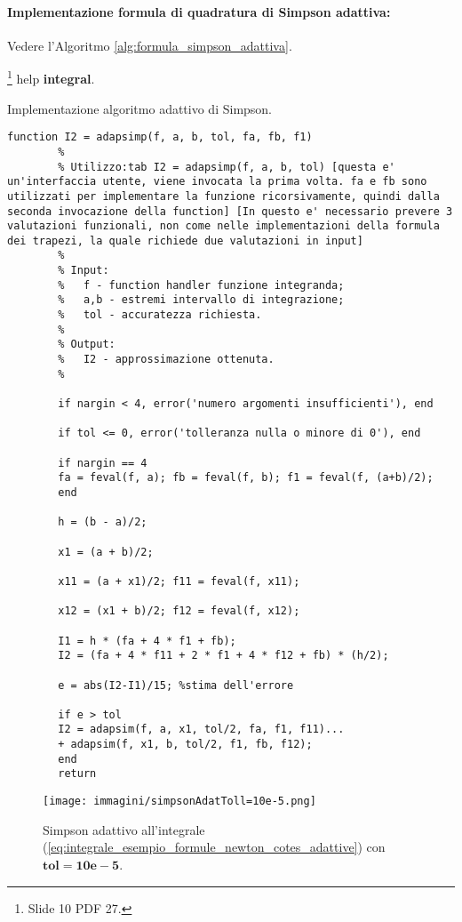 \paragraph{Implementazione formula di quadratura di Simpson adattiva:} Vedere l'Algoritmo \ref{alg:formula_simpson_adattiva}.

\begin{remark}
	\footnote{Slide 10 PDF 27.} help \textbf{integral}.
\end{remark}


\begin{algorithm}\caption{Implementazione algoritmo adattivo di Simpson.}
	\label{alg:formula_simpson_adattiva}
	\begin{lstlisting}[style=Matlab-editor]
		function I2 = adapsimp(f, a, b, tol, fa, fb, f1)
		%
		% Utilizzo:tab I2 = adapsimp(f, a, b, tol) [questa e' un'interfaccia utente, viene invocata la prima volta. fa e fb sono utilizzati per implementare la funzione ricorsivamente, quindi dalla seconda invocazione della function] [In questo e' necessario prevere 3 valutazioni funzionali, non come nelle implementazioni della formula dei trapezi, la quale richiede due valutazioni in input]
		%
		% Input:
		%   f - function handler funzione integranda;
		%   a,b - estremi intervallo di integrazione;
		%   tol - accuratezza richiesta.
		%
		% Output:
		%   I2 - approssimazione ottenuta.
		%
		
		if nargin < 4, error('numero argomenti insufficienti'), end
		
		if tol <= 0, error('tolleranza nulla o minore di 0'), end 
		
		if nargin == 4
		fa = feval(f, a); fb = feval(f, b); f1 = feval(f, (a+b)/2);
		end
		
		h = (b - a)/2;
		
		x1 = (a + b)/2;
		
		x11 = (a + x1)/2; f11 = feval(f, x11);
		
		x12 = (x1 + b)/2; f12 = feval(f, x12);
		
		I1 = h * (fa + 4 * f1 + fb); 
		I2 = (fa + 4 * f11 + 2 * f1 + 4 * f12 + fb) * (h/2);
		
		e = abs(I2-I1)/15; %stima dell'errore
		
		if e > tol
		I2 = adapsim(f, a, x1, tol/2, fa, f1, f11)...
		+ adapsim(f, x1, b, tol/2, f1, fb, f12); 
		end
		return
	\end{lstlisting}
\end{algorithm}

\begin{figure}
    \centering
    \texttt{[image: immagini/simpsonAdatToll=10e-5.png]}
    \caption{Simpson adattivo all'integrale (\ref{eq:integrale_esempio_formule_newton_cotes_adattive}) con $\boldsymbol{tol=10e-5}$.}\label{fig:simpsonAdatToll=10e-5}
\end{figure}
